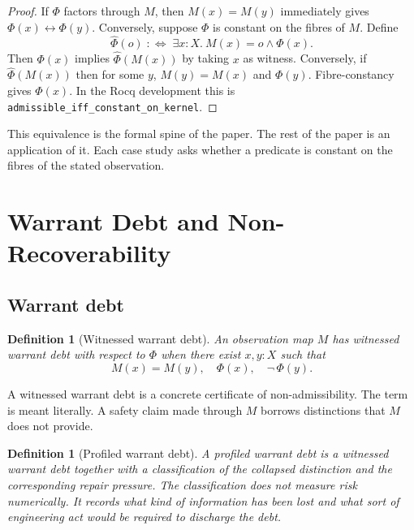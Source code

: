 \documentclass[a4paper,11pt]{article}
\newtheorem{definition}[theorem]{Definition}
\begin{document}
\begin{proof}
If \(\Phi\) factors through \(M\), then \(M(x)=M(y)\) immediately gives
\(\Phi(x)\leftrightarrow\Phi(y)\). Conversely, suppose \(\Phi\) is constant on
the fibres of \(M\). Define
\[
  \widehat{\Phi}(o) \;:\!\!\iff\; \exists x:X.\ M(x)=o \wedge \Phi(x).
\]
Then \(\Phi(x)\) implies \(\widehat{\Phi}(M(x))\) by taking \(x\) as witness.
Conversely, if \(\widehat{\Phi}(M(x))\) then for some \(y\), \(M(y)=M(x)\) and
\(\Phi(y)\). Fibre-constancy gives \(\Phi(x)\). In the Rocq development this is
\texttt{admissible\_iff\_constant\_on\_kernel}.
\end{proof}

This equivalence is the formal spine of the paper. The rest of the paper is an
application of it. Each case study asks whether a predicate is constant on the
fibres of the stated observation.

\section{Warrant Debt and Non-Recoverability}
\label{sec:warrant}

\subsection{Warrant debt}

\begin{definition}[Witnessed warrant debt]
\label{def:debt}
An observation map \(M\) has \emph{witnessed warrant debt} with respect to
\(\Phi\) when there exist \(x, y : X\) such that
\[
  M(x) = M(y),\quad \Phi(x),\quad \neg\,\Phi(y).
\]
\end{definition}

A witnessed warrant debt is a concrete certificate of non-admissibility. The
term is meant literally. A safety claim made through \(M\) borrows distinctions
that \(M\) does not provide.

\begin{definition}[Profiled warrant debt]
\label{def:profiled-debt}
A \emph{profiled warrant debt} is a witnessed warrant debt together with a
classification of the collapsed distinction and the corresponding repair
pressure.  The classification does not measure risk numerically.  It records
what kind of information has been lost and what sort of engineering act would
be required to discharge the debt.
\end{definition}
\end{document}
